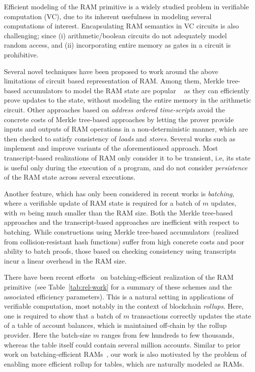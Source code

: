 Efficient modeling of the RAM primitive is a widely studied problem in
verifiable computation (VC), due to its inherent usefulness in modeling several computations of interest.
Encapsulating RAM semantics in VC circuits is also challenging; since (i) arithmetic/boolean circuits do not
adequately model random access, and (ii) incorporating entire memory as gates in a circuit is prohibitive.

Several novel techniques have been proposed to work around the above limitations of circuit based representation
of RAM. Among them, Merkle tree-based accumulators to model the RAM state are popular
~\cite{EPRINT:BFRSBW13,compwithstate,C:BCTV14} as they can efficiently
prove updates to the state, without modeling the entire memory in the arithmetic circuit. Other
approaches based on {\em address ordered time-scripts} avoid the concrete costs of Merkle tree-based approaches
by letting the prover provide inputs and outputs of RAM operations in a non-deterministic manner, which
are then checked to satisfy consistency of {\em loads} and {\em stores}.
Several works such as \cite{NDSS:WSRBW15,USENIX:BCTV14,C:BCGTV13,SP:ZGKPP18} implement and improve variants
of the aforementioned approach. Most transcript-based realizations of RAM only consider it to be transient,
i.e, its state is useful only during the execution of a program, and do not consider {\em persistence} of the
RAM state across several executions. 

Another feature, which has only been considered in recent works
\cite{USENIX:OWWB20,CCS:CFHKKO22} is {\em batching}, where a verifiable update of RAM state is required
for a batch of $m$ updates, with $m$ being much smaller than the RAM size. Both the Merkle tree-based approaches
and the transcript-based approaches are inefficient with respect to batching.
While constructions using Merkle tree-based accumulators~(realized from collision-resistant hash functions) suffer from high concrete costs and poor
ability to batch proofs, those based on checking consistency using transcripts incur a linear overhead in the
RAM size.

\smallskip

 There have been recent efforts~\cite{USENIX:OWWB20,CCS:CFHKKO22} on batching-efficient
realization of the RAM primitive~(see Table~\ref{tab:rel-work} for a summary of these schemes and the associated efficiency parameters). This is a natural setting in applications of verifiable
computation, most notably in the context of blockchain {\em rollups}. Here, one is required
to show that a batch of $m$ transactions correctly updates the state of a table of account balances, which
is maintained off-chain by the rollup provider. Here the batch-size $m$ ranges from few hundreds to few
thousands, whereas the table itself could contain several million accounts.
Similar to prior work on batching-efficient RAMs~\cite{USENIX:OWWB20,CCS:CFHKKO22}, our work is also motivated
 by the problem of enabling more efficient rollup for tables, which are
naturally modeled as RAMs.


